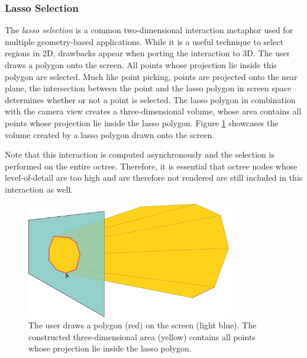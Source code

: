 \subsubsection{Lasso Selection}

The \textit{lasso selection} is a common two-dimensional interaction metaphor used for multiple geometry-based applications. While it is a useful technique to select regions in 2D, drawbacks appear when porting the interaction to 3D. The user draws a polygon onto the screen. All points whose projection lie inside this polygon are selected. Much like point picking, points are projected onto the near plane, the intersection between the point and the lasso polygon in screen space determines whether or not a point is selected. The lasso polygon in combination with the camera view creates a three-dimensional volume, whose area contains all points whose projection lie inside the lasso polygon. Figure \ref{fig:lasso_sketch} showcases the volume created by a lasso polygon drawn onto the screen.

Note that this interaction is computed asynchronously and the selection is performed on the entire octree. Therefore, it is essential that octree nodes whose level-of-detail are too high and are therefore not rendered are still included in this interaction as well. 


\begin{figure}
    \centering
    \includegraphics[width=0.8\textwidth]{System_Design/lasso_sketch.png}%
    \caption[Illustration of the creation of a lasso selection]
    {The user draws a polygon (red) on the screen (light blue). The constructed three-dimensional area (yellow) contains all points whose projection lie inside the lasso polygon. }
    \label{fig:lasso_sketch}
\end{figure}


